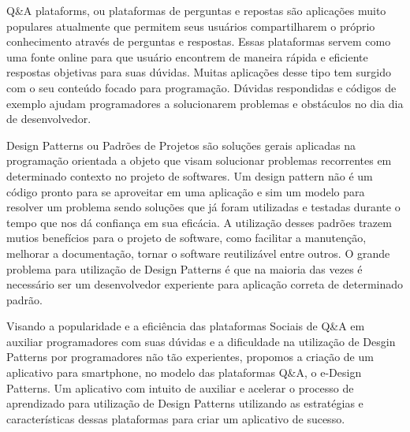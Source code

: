 Q\&A plataforms, ou plataformas de perguntas e repostas são aplicações muito populares atualmente que permitem seus usuários compartilharem
 o próprio conhecimento através de perguntas e respostas. Essas plataformas servem como uma fonte online para que usuário encontrem de maneira
 rápida e eficiente respostas objetivas para suas dúvidas. Muitas aplicações desse tipo tem surgido com o seu conteúdo focado para programação.
 Dúvidas respondidas e códigos de exemplo ajudam programadores a solucionarem problemas e obstáculos no dia dia de desenvolvedor.

Design Patterns ou Padrões de Projetos são soluções gerais aplicadas na programação orientada a objeto que visam solucionar problemas recorrentes
 em determinado contexto no projeto de softwares. Um design pattern não é um código pronto para se aproveitar em uma aplicação e sim um modelo
 para resolver um problema sendo soluções que já foram utilizadas e testadas durante o tempo que nos dá confiança em sua eficácia. A utilização desses
 padrões trazem mutios benefícios para o projeto de software, como facilitar a manutenção, melhorar a documentação, tornar o software reutilizável
 entre outros. O grande problema para utilização de Design Patterns é que na maioria das vezes é necessário ser um desenvolvedor experiente para
 aplicação correta de determinado padrão.

Visando a popularidade e a eficiência das plataformas Sociais de Q\&A em auxiliar programadores com suas dúvidas e a dificuldade na utilização de
 Desgin Patterns por programadores não tão experientes, propomos a criação de um aplicativo para smartphone, no modelo das plataformas Q\&A,
 o e-Design Patterns. Um aplicativo com intuito de auxiliar e acelerar o processo de aprendizado para utilização de Design Patterns utilizando as estratégias
 e características dessas plataformas para criar um aplicativo de sucesso.